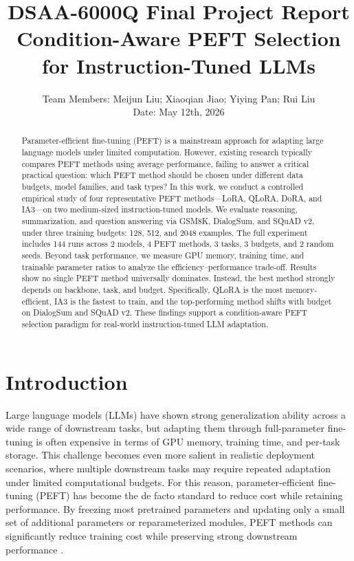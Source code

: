 \documentclass{article}
\title{DSAA-6000Q Final Project Report\\Condition-Aware PEFT Selection for Instruction-Tuned LLMs}
\author{Team Members: Meijun Liu; Xiaoqian Jiao; Yiying Pan; Rui Liu \\ Date: May 12th, 2026}
\date{}
\begin{document}
\maketitle

\begin{abstract}
Parameter-efficient fine-tuning (PEFT) is a mainstream approach for adapting large language models under limited computation. However, existing research typically compares PEFT methods using average performance, failing to answer a critical practical question: which PEFT method should be chosen under different data budgets, model families, and task types? In this work, we conduct a controlled empirical study of four representative PEFT methods—LoRA, QLoRA, DoRA, and IA3—on two medium-sized instruction-tuned models. We evaluate reasoning, summarization, and question answering via GSM8K, DialogSum, and SQuAD v2, under three training budgets: 128, 512, and 2048 examples. The full experiment includes 144 runs across 2 models, 4 PEFT methods, 3 tasks, 3 budgets, and 2 random seeds. Beyond task performance, we measure GPU memory, training time, and trainable parameter ratios to analyze the efficiency–performance trade-off. Results show no single PEFT method universally dominates. Instead, the best method strongly depends on backbone, task, and budget. Specifically, QLoRA is the most memory-efficient, IA3 is the fastest to train, and the top-performing method shifts with budget on DialogSum and SQuAD v2. These findings support a condition-aware PEFT selection paradigm for real-world instruction-tuned LLM adaptation.
\end{abstract}

\section{Introduction}

Large language models (LLMs) have shown strong generalization ability across a wide range of downstream tasks, but adapting them through full-parameter fine-tuning is often expensive in terms of GPU memory, training time, and per-task storage. This challenge becomes even more salient in realistic deployment scenarios, where multiple downstream tasks may require repeated adaptation under limited computational budgets. For this reason, parameter-efficient fine-tuning (PEFT) has become the de facto standard to reduce cost while retaining performance. By freezing most pretrained parameters and updating only a small set of additional parameters or reparameterized modules, PEFT methods can significantly reduce training cost while preserving strong downstream performance \cite{hu2022lora,liu2022ia3,dettmers2023qlora}.
\end{document}
